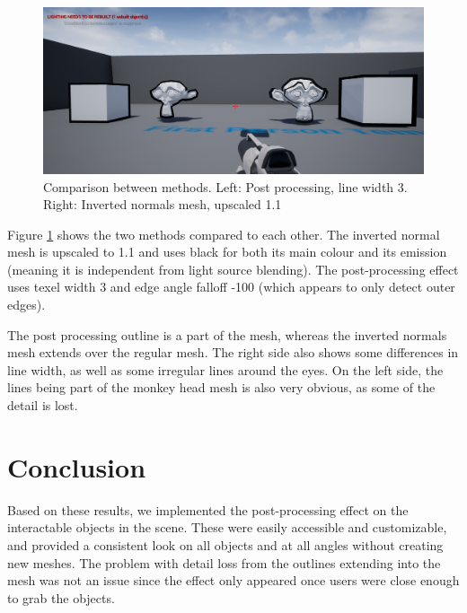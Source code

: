 \begin{figure}[H]
\centering
\includegraphics[width=1.0\textwidth]{Shader/comparison.png}
\caption{Comparison between methods. Left: Post processing, line width 3. Right: Inverted normals mesh, upscaled 1.1}
\label{fig:comparison}
\end{figure}

Figure \ref{fig:comparison} shows the two methods compared to each other. The inverted normal mesh is upscaled to 1.1 and uses black for both its main colour and its emission (meaning it is independent from light source blending). The post-processing effect uses texel width 3 and edge angle falloff -100 (which appears to only detect outer edges).

The post processing outline is a part of the mesh, whereas the inverted normals mesh extends over the regular mesh. The right side also shows some differences in line width, as well as some irregular lines around the eyes. On the left side, the lines being part of the monkey head mesh is also very obvious, as some of the detail is lost. 

\section*{Conclusion}

Based on these results, we implemented the post-processing effect on the interactable objects in the scene. These were easily accessible and customizable, and provided a consistent look on all objects and at all angles without creating new meshes. The problem with detail loss from the outlines extending into the mesh was not an issue since the effect only appeared once users were close enough to grab the objects.
